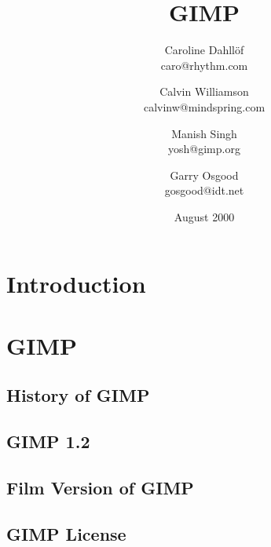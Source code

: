 \documentclass{report}
\begin{document}
\begin{titlepage}
\title{\huge GIMP}
\author{Caroline Dahll\"{o}f\\
caro@rhythm.com 
\and Calvin Williamson\\
calvinw@mindspring.com
\and Manish Singh\\
yosh@gimp.org
\and Garry Osgood\\
gosgood@idt.net}
\date{August 2000}
\maketitle
\end{titlepage}
\tableofcontents


% 
%



\chapter{Introduction}


\chapter{GIMP}

\section{History of GIMP} 

\section{GIMP 1.2}

\section{Film Version of GIMP} 

\section{GIMP License}

\end{document}
